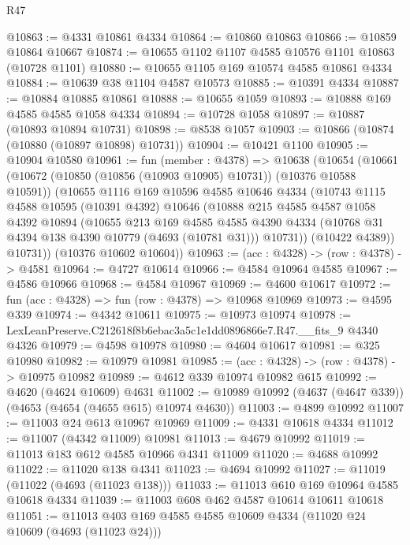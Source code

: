 \begin{lexlean}{R47}
\begin{coremodule}
@10863 := @4331 @10861 @4334
@10864 := @10860 @10863
@10866 := @10859 @10864 @10667
@10874 := @10655 @1102 @1107 @4585 @10576 @1101 @10863 (@10728 @1101)
@10880 := @10655 @1105 @169 @10574 @4585 @10861 @4334
@10884 := @10639 @38 @1104 @4587 @10573
@10885 := @10391 @4334
@10887 := @10884 @10885 @10861
@10888 := @10655 @1059
@10893 := @10888 @169 @4585 @4585 @1058 @4334
@10894 := @10728 @1058
@10897 := @10887 (@10893 @10894 @10731)
@10898 := @8538 @1057
@10903 := @10866 (@10874 (@10880 (@10897 @10898) @10731))
@10904 := @10421 @1100
@10905 := @10904 @10580
@10961 := fun (member : @4378) =>
  @10638
    (@10654
      (@10661
        (@10672 (@10850 (@10856 (@10903 @10905) @10731)) (@10376 @10588 @10591))
        (@10655
          @1116
          @169
          @10596
          @4585
          @10646
          @4334
          (@10743
            @1115
            @4588
            @10595
            (@10391 @4392)
            @10646
            (@10888
              @215
              @4585
              @4587
              @1058
              @4392
              @10894
              (@10655
                @213
                @169
                @4585
                @4585
                @4390
                @4334
                (@10768 @31 @4394 @138 @4390 @10779 (@4693 (@10781 @31)))
                @10731))
            (@10422 @4389))
          @10731))
      (@10376 @10602 @10604))
@10963 := (acc : @4328) -> (row : @4378) -> @4581
@10964 := @4727 @10614
@10966 := @4584 @10964 @4585
@10967 := @4586 @10966
@10968 := @4584 @10967
@10969 := @4600 @10617
@10972 := fun (acc : @4328) => fun (row : @4378) => @10968 @10969
@10973 := @4595 @339
@10974 := @4342 @10611
@10975 := @10973 @10974
@10978 := LexLeanPreserve.C212618f8b6ebac3a5c1e1dd0896866e7.R47.__fits_9 @4340 @4326
@10979 := @4598 @10978
@10980 := @4604 @10617
@10981 := @325 @10980
@10982 := @10979 @10981
@10985 := (acc : @4328) -> (row : @4378) -> @10975 @10982
@10989 := @4612 @339 @10974 @10982 @615
@10992 := @4620 (@4624 @10609) @4631
@11002 := @10989 @10992 (@4637 (@4647 @339)) (@4653 (@4654 (@4655 @615) @10974 @4630))
@11003 := @4899 @10992
@11007 := @11003 @24 @613 @10967 @10969
@11009 := @4331 @10618 @4334
@11012 := @11007 (@4342 @11009) @10981
@11013 := @4679 @10992
@11019 := @11013 @183 @612 @4585 @10966 @4341 @11009
@11020 := @4688 @10992
@11022 := @11020 @138 @4341
@11023 := @4694 @10992
@11027 := @11019 (@11022 (@4693 (@11023 @138)))
@11033 := @11013 @610 @169 @10964 @4585 @10618 @4334
@11039 := @11003 @608 @462 @4587 @10614 @10611 @10618
@11051 := @11013 @403 @169 @4585 @4585 @10609 @4334 (@11020 @24 @10609 (@4693 (@11023 @24)))

\end{coremodule}
\end{lexlean}
